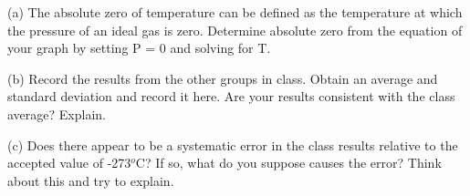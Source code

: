 (a) The absolute zero of temperature can be defined as the temperature
at which the pressure of an ideal gas is zero. Determine absolute
zero from the equation of your graph by setting P = 0 and solving for T.
\vspace{30mm}

(b) Record the results from the other groups in class.
Obtain an average and standard deviation and record it here.
Are your results consistent with the class average?  Explain.
\vspace{30mm}

(c) Does there appear to be a systematic error in the class results relative 
to the accepted value of -273\( ^{o } \)C? If so, what do you suppose 
causes the error? Think about this and try to explain.

